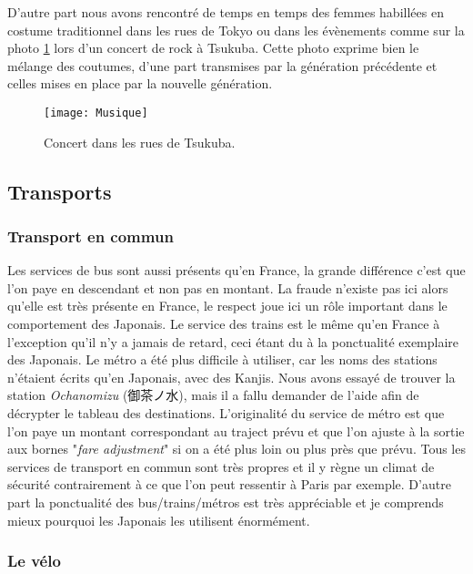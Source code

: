 \documentclass[11pt,journal]{RapportFR}
\begin{document}
\begin{CJK*}{UTF8}{min}
D'autre part nous avons rencontr\'e de temps en temps des femmes habill\'ees en costume traditionnel dans les rues de Tokyo ou dans les \'ev\`enements comme sur la photo \ref{fig_music} lors d'un concert de rock \`a Tsukuba. Cette photo exprime bien le m\'elange des coutumes, d'une part transmises par la g\'en\'eration pr\'ec\'edente et celles mises en place par la nouvelle g\'en\'eration.

\begin{figure}[!t]
\centering
\texttt{[image: Musique]}
\caption{Concert dans les rues de Tsukuba.}
\label{fig_music}
\end{figure}

\subsection{Transports}

\subsubsection{Transport en commun}

Les services de bus sont aussi pr\'esents qu'en France, la grande diff\'erence c'est que l'on paye en descendant et non pas en montant. La fraude n'existe pas ici alors qu'elle est tr\`es pr\'esente en France, le respect joue ici un r\^ole important dans le comportement des Japonais.
Le service des trains est le m\^eme qu'en France \`a l'exception qu'il n'y a jamais de retard, ceci \'etant du \`a la ponctualit\'e exemplaire des Japonais.
Le m\'etro a \'et\'e plus difficile \`a utiliser, car les noms des stations n'\'etaient \'ecrits qu'en Japonais, avec des Kanjis. Nous avons essay\'e de trouver la station \textit{Ochanomizu} (御茶ノ水), mais il a fallu demander de l'aide afin de d\'ecrypter le tableau des destinations.
L'originalit\'e du service de m\'etro est que l'on paye un montant correspondant au traject pr\'evu et que l'on ajuste \`a la sortie aux bornes "\textit{fare adjustment}" si on a \'et\'e plus loin ou plus pr\`es que pr\'evu.
Tous les services de transport en commun sont tr\`es propres et il y r\`egne un climat de s\'ecurit\'e contrairement \`a ce que l'on peut ressentir \`a Paris par exemple. D'autre part la ponctualit\'e des bus/trains/m\'etros est tr\`es appr\'eciable et je comprends mieux pourquoi les Japonais les utilisent \'enorm\'ement.

\subsubsection{Le v\'elo}


\end{CJK*}
\end{document}
